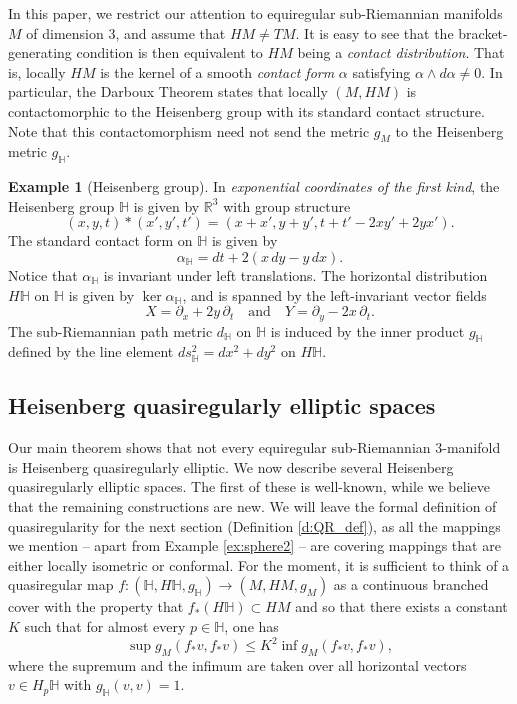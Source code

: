 \documentclass[10pt,letterpaper]{amsart}
\theoremstyle{definition}
\newtheorem{example}[thm]{Example}
\numberwithin{thm}{subsection}
\numberwithin{equation}{section}
\begin{document}
In this paper, we restrict our attention to equiregular
sub-Riemannian manifolds $M$ of dimension 3, and assume that $HM
\neq TM$. It is easy to see that the
bracket-generating condition is
then equivalent to $HM$ being a \emph{contact distribution}. That is,
locally $HM$ is the kernel of a smooth \emph{contact form} $\alpha$
satisfying $\alpha \wedge d \alpha \neq 0$. In particular, the
Darboux Theorem states that locally $(M, HM)$ is
contactomorphic to
the Heisenberg group with its standard contact structure. Note
that this
contactomorphism need not send the metric $g_M$ to the
Heisenberg metric $g_{\mathbb H}$.

\begin{example}[Heisenberg group]
In \emph{exponential coordinates of the first kind}, the Heisenberg group ${\mathbb H}$ is
given by ${\mathbb R}^3$ with group structure
$$(x,y,t)*(x',y',t') = (x+x', y+y', t+t'-2xy'+2yx').$$
The standard contact form on ${\mathbb H}$ is given by
$$\alpha_{\mathbb H} = dt + 2(x\,dy - y\,dx).$$
Notice that $\alpha_{\mathbb H}$ is invariant under left
translations. The horizontal distribution $H{\mathbb H}$ on ${\mathbb H}$ is given by $\ker \alpha_{\mathbb H}$, and is spanned by the left-invariant vector fields
\begin{equation}\label{eq:horiz_vfd}
X= \partial_x + 2y \, \partial_t\quad\text{and}\quad Y = \partial_y -2x \, \partial_t.
\end{equation}
The sub-Riemannian path metric $d_{\mathbb H}$ on ${\mathbb H}$ is induced
by the inner product $g_{\mathbb H}$ defined by the line element
$ds_{\mathbb H}^2 = dx^2+dy^2$ on $H{\mathbb H}$.
\end{example}

\subsection{Heisenberg quasiregularly elliptic spaces}\label{ss:ex}
\label{sec:newexamples}

Our main theorem shows that not every
equiregular sub-Riemannian 3-manifold is
Heisenberg quasiregularly elliptic.
We now describe several Heisenberg quasiregularly elliptic spaces.
The first of these is well-known, while we believe that the
remaining constructions are new. We will leave the formal
definition of quasiregularity for the next section (Definition
\ref{d:QR_def}), as all the mappings we mention -- apart from
Example \ref{ex:sphere2} -- are covering mappings that are either
locally isometric or conformal.
 For the
moment, it is sufficient to think of a quasiregular map
$f:({\mathbb H},H{\mathbb H},g_{\mathbb H})\to (M,HM,g_M)$ as a continuous
branched cover with the property that $f_{\ast}(H{\mathbb H})\subset HM$ and so that there exists a constant $K$ such that for
almost every $p\in {\mathbb H}$, one has
\begin{displaymath}
\sup g_M(f_{\ast} v, f_{\ast} v)\leq K^2 \inf g_M(f_{\ast} v,
f_{\ast} v),
\end{displaymath}
where the supremum and the infimum are taken over all horizontal
vectors $v\in H_p {\mathbb H}$ with $g_{\mathbb H}(v,v)=1$.
\end{document}
